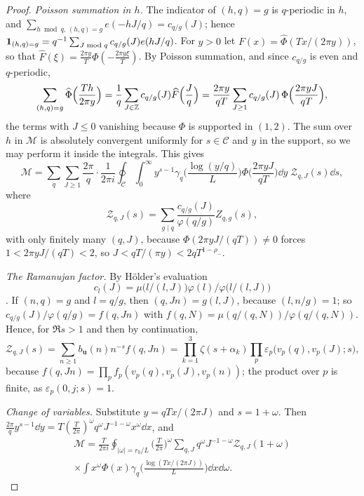 \documentclass[11pt,colorlinks]{charlie}
\begin{document}
\begin{proof}
\emph{Poisson summation in $h$.} The indicator of $(h,q)=g$ is $q$-periodic in $h$, and $\sum_{h\bmod q,\,(h,q)=g}e(-hJ/q)=c_{q/g}(J)$; hence $\mathbf{1}_{(h,q)=g}=q^{-1}\sum_{J\bmod q}c_{q/g}(J)e(hJ/q)$. For $y>0$ let $F(x)=\widehat\Phi(Tx/(2\pi y))$, so that $\widehat F(\xi)=\frac{2\pi y}T\Phi(-\frac{2\pi y\xi}T)$. By Poisson summation, and since $c_{q/g}$ is even and $q$-periodic,
\[
 \sum_{(h,q)=g}\widehat\Phi\Big(\frac{Th}{2\pi y}\Big)=\frac1q\sum_{J\in\mathbb{Z}}c_{q/g}(J)\widehat F\Big(\frac Jq\Big)=\frac{2\pi y}{qT}\sum_{J\ge1}c_{q/g}(J)\,\Phi\Big(\frac{2\pi yJ}{qT}\Big),
\]
the terms with $J\le0$ vanishing because $\Phi$ is supported in $(1,2)$. The sum over $h$ in $\mathcal M$ is absolutely convergent uniformly for $s\in\mathcal C$ and $y$ in the support, so we may perform it inside the integrals. This gives
\[
 \mathcal M=\sum_q\sum_{J\ge1}\frac{2\pi}q\cdot\frac1{2\pi i}\oint_{\mathcal C}\int_0^\infty y^{s-1}\gamma_q\Big(\frac{\log(y/q)}L\Big)\Phi\Big(\frac{2\pi yJ}{qT}\Big)\dd y\;\mathcal Z_{q,J}(s)\dd s,
\]
where
\[
 \mathcal Z_{q,J}(s)=\sum_{g\mid q}\frac{c_{q/g}(J)}{\varphi(q/g)}Z_{q,g}(s),
\]
with only finitely many $(q,J)$, because $\Phi(2\pi yJ/(qT))\ne0$ forces $1<2\pi yJ/(qT)<2$, so $J<qT/(\pi y)<2qT^{1-\rho_-}$.

\emph{The Ramanujan factor.} By H\"older's evaluation
\[
 c_l(J)=\mu\big(l/(l,J)\big)\varphi(l)/\varphi\big(l/(l,J)\big)
\]
\cite[\S8.4]{Apostol}. If $(n,q)=g$ and $l=q/g$, then $(q,Jn)=g(l,J)$, because $(l,n/g)=1$; so $c_{q/g}(J)/\varphi(q/g)=f(q,Jn)$ with $f(q,N)=\mu(q/(q,N))/\varphi(q/(q,N))$. Hence, for $\Re s>1$ and then by continuation,
\[
 \mathcal Z_{q,J}(s)=\sum_{n\ge1}b_{\boldsymbol u}(n)n^{-s}f(q,Jn)=\prod_{k=1}^3\zeta(s+\alpha_k)\prod_p\varepsilon_p\big(v_p(q),v_p(J);s\big),
\]
because $f(q,Jn)=\prod_pf_p(v_p(q),v_p(J),v_p(n))$; the product over $p$ is finite, as $\varepsilon_p(0,j;s)=1$.

\emph{Change of variables.} Substitute $y=qTx/(2\pi J)$ and $s=1+\omega$. Then $\frac{2\pi}qy^{s-1}\dd y=T(\frac T{2\pi})^\omega q^\omega J^{-1-\omega}x^\omega\dd x$, and
\begin{multline*}
 \mathcal M=\frac T{2\pi i}\oint_{|\omega|=r_0/L}\Big(\frac T{2\pi}\Big)^\omega\sum_{q,J}q^\omega J^{-1-\omega}\mathcal Z_{q,J}(1+\omega)\\
 \times\int x^\omega\Phi(x)\gamma_q\Big(\frac{\log(Tx/(2\pi J))}L\Big)\dd x\dd\omega .
\end{multline*}


\end{proof}
\end{document}
